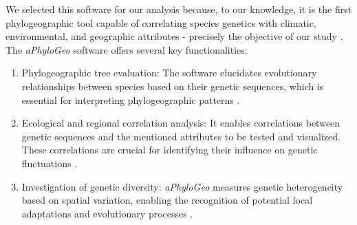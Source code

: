 We selected this software for our analysis because, to our knowledge, it is the first phylogeographic tool capable of correlating species genetics with climatic, environmental, and geographic attributes - precisely the objective of our study \citep{koshkarov_phylogeography_2022}. The \textit{aPhyloGeo} software offers several key functionalities:

\begin{enumerate}[label=\arabic*.]
\item Phylogeographic tree evaluation: The software elucidates evolutionary relationships between species based on their genetic sequences, which is essential for interpreting phylogeographic patterns \citep{koshkarov_phylogeography_2022}.
\item Ecological and regional correlation analysis: It enables correlations between genetic sequences and the mentioned attributes to be tested and visualized. These correlations are crucial for identifying their influence on genetic fluctuations \citep{koshkarov_phylogeography_2022}.
\item Investigation of genetic diversity: \textit{aPhyloGeo} measures genetic heterogeneity based on spatial variation, enabling the recognition of potential local adaptations and evolutionary processes \citep{manel_perspectives_2010}.
\end{enumerate}

